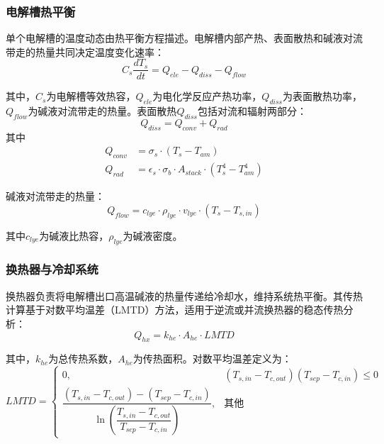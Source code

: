 \subsubsection{电解槽热平衡}

单个电解槽的温度动态由热平衡方程描述。电解槽内部产热、表面散热和碱液对流带走的热量共同决定温度变化速率：
\begin{equation}
  C_s \frac{dT_s}{dt} = Q_{ele} - Q_{diss} - Q_{flow}
\end{equation}

其中，$C_s$为电解槽等效热容，$Q_{ele}$为电化学反应产热功率，$Q_{diss}$为表面散热功率，$Q_{flow}$为碱液对流带走的热量。表面散热$Q_{diss}$包括对流和辐射两部分：
\begin{equation}
  Q_{diss} = Q_{conv} + Q_{rad}
\end{equation}
其中
\begin{align}
  Q_{conv} &= \sigma_s \cdot (T_s - T_{am}) \\
  Q_{rad} &= \epsilon_s \cdot \sigma_b \cdot A_{stack} \cdot (T_s^4 - T_{am}^4)
\end{align}

碱液对流带走的热量：
\begin{equation}
  Q_{flow} = c_{lye} \cdot \rho_{lye} \cdot v_{lye} \cdot (T_s - T_{s,in})
\end{equation}

其中$c_{lye}$为碱液比热容，$\rho_{lye}$为碱液密度。

\subsubsection{换热器与冷却系统}

换热器负责将电解槽出口高温碱液的热量传递给冷却水，维持系统热平衡。其传热计算基于对数平均温差（LMTD）方法，适用于逆流或并流换热器的稳态传热分析：
\begin{equation}
  Q_{hx} = k_{he} \cdot A_{he} \cdot LMTD
\end{equation}

其中，$k_{he}$为总传热系数，$A_{he}$为传热面积。对数平均温差定义为：
\begin{equation}
  LMTD = \begin{cases}
    0, & (T_{s,in} - T_{c,out})(T_{sep} - T_{c,in}) \leq 0 \\[6pt]
    \dfrac{(T_{s,in} - T_{c,out}) - (T_{sep} - T_{c,in})}{\ln\left(\dfrac{T_{s,in} - T_{c,out}}{T_{sep} - T_{c,in}}\right)}, & \text{其他}
  \end{cases}
\end{equation}

